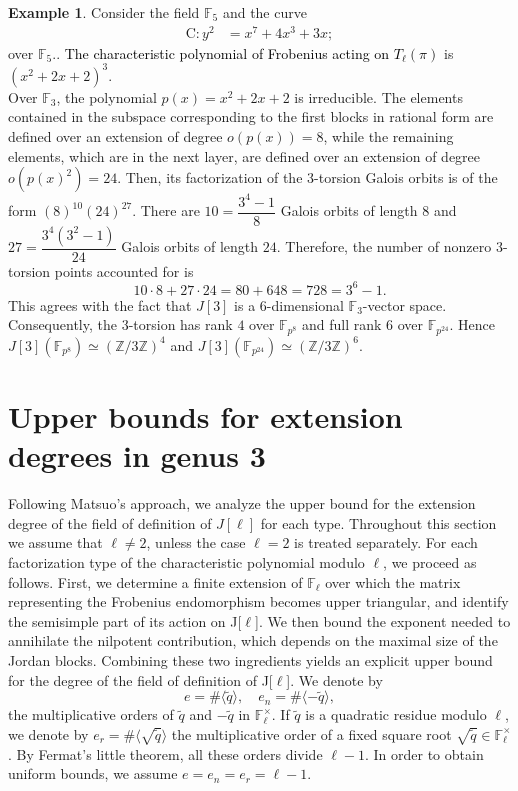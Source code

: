 \documentclass[11pt,a4paper]{article}
\theoremstyle{plain}
\theoremstyle{definition}
\newtheorem{example}[theorem]{Example}
\theoremstyle{remark}
\newcommand{\verde}[1]{\textcolor{black}{#1}}
\newcommand\C{\mathrm{C}}
\begin{document}
\begin{example}\label{examplew}
Consider the field $\mathbb{F}_5$ and the curve %
\begin{align*}
\C : y^2&= x^7 + 4x^3 + 3x;
\end{align*} 
over $\mathbb{F}_5.$. \verde {The characteristic polynomial of Frobenius acting on $T_{\ell}(\pi)$} is $(x^2+2x+2)^3$. \\
Over $\mathbb{F}_3$, the polynomial
$p(x)=x^2+2x+2$ is irreducible.
The elements contained in the subspace corresponding to the first blocks in rational form are defined over an extension of degree $o(p(x)) = 8$, while the remaining elements, which are in the next layer, are defined over an extension of degree $o(p(x)^2) = 24$.
Then, its factorization of the 3-torsion Galois orbits
is of the form $(8)^{10}(24)^{27}$. 
There are $10=\dfrac{3^4-1}{8}$ Galois orbits of length $8$ and $27=\dfrac{3^4(3^2-1)}{24}$ Galois orbits of length
$24$. Therefore, the number of nonzero $3$-torsion points accounted for is
\[
10\cdot 8 + 27\cdot 24 = 80+648=728=3^6-1.
\]
This agrees with the fact that $J[3]$ is a $6$-dimensional
$\mathbb F_3$-vector space.
Consequently, the $3$-torsion has rank $4$ over $\mathbb F_{p^8}$ and full
rank $6$ over $\mathbb F_{p^{24}}$. Hence $J[3](\mathbb F_{p^8})\simeq (\mathbb Z/3\mathbb Z)^4$ and 
$J[3](\mathbb F_{p^{24}})\simeq (\mathbb Z/3\mathbb Z)^6.$
\end{example}

\section{Upper bounds for extension degrees in genus 3}




Following Matsuo's approach, we analyze the upper bound for the extension degree of the field of definition of \(J[\ell]\) for each type.
Throughout this section we assume that $\ell\neq 2$, unless the case $\ell=2$ is treated separately. For each factorization type of the characteristic polynomial modulo $\ell$, we proceed as follows.
First, we determine a finite extension of $\mathbb{F}_\ell$ over which the matrix representing the Frobenius endomorphism becomes upper triangular, and identify the semisimple part of its action on  J[$\ell$].
We then bound the exponent needed to annihilate the nilpotent contribution, which depends on the maximal size of the Jordan blocks.
Combining these two ingredients yields an explicit upper bound for the degree of the field of definition of J[$\ell$].
 We denote by
\[
e = \#\langle \tilde{q} \rangle,\quad
e_n = \#\langle -\tilde{q} \rangle,
\]
the multiplicative orders of $\tilde q$ and $-\tilde q$ in
$\mathbb F_\ell^\times$.
If $\tilde q$ is a quadratic residue modulo $\ell$, we denote by $e_r=\#\langle\sqrt{\tilde q}\rangle$
the multiplicative order of a fixed square root
$\sqrt{\tilde q}\in\mathbb F_\ell^\times$.
By Fermat's little theorem, all these orders divide $\ell - 1$.
In order to obtain uniform bounds, we  assume
$e = e_n = e_r = \ell - 1$.
\end{document}
